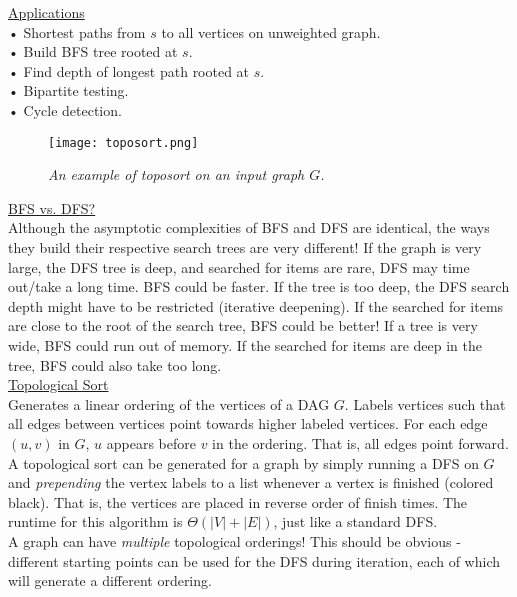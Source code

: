 \documentclass[12pt, fleqn]{general}
\begin{document}
\begin{multicols*}{2}
    \underline{Applications}\\
    • Shortest paths from $s$ to all vertices on unweighted graph.\\
    • Build BFS tree rooted at $s$.\\
    • Find depth of longest path rooted at $s$.\\
    • Bipartite testing.\\
    • Cycle detection.\\

    \begin{figure*}[t]
        \centering
        \texttt{[image: toposort.png]}
        \caption*{\emph{An example of toposort on an input graph $G$.}}
    \end{figure*}

    \underline{BFS vs. DFS?}\\
    
    Although the asymptotic complexities of BFS and DFS are identical, the ways they build their respective search trees are very different! If the graph is very large, the DFS tree is deep, and searched for items are rare, DFS may time out/take a long time. BFS could be faster. If the tree is too deep, the DFS search depth might have to be restricted (iterative deepening). If the searched for items are close to the root of the search tree, BFS could be better! If a tree is very wide, BFS could run out of memory. If the searched for items are deep in the
    tree, BFS could also take too long.\\

    {\large \underline{Topological Sort}}\\

    Generates a linear ordering of the vertices of a DAG $G$. Labels vertices such that all edges between vertices point towards higher labeled vertices. For each edge $(u, v)$ in $G$, $u$ appears before $v$ in the ordering. That is, all edges point forward.\\

    A topological sort can be generated for a graph by simply running a DFS on $G$ and \emph{prepending} the vertex labels to a list whenever a vertex is finished (colored black). That is, the vertices are placed in reverse order of finish times. The runtime for this algorithm is $\Theta(|V| + |E|)$, just like a standard DFS.\\

    A graph can have \emph{multiple} topological orderings! This should be obvious - different starting points can be used for the DFS during iteration, each of which will generate a different ordering.\\


\end{multicols*}
\end{document}
